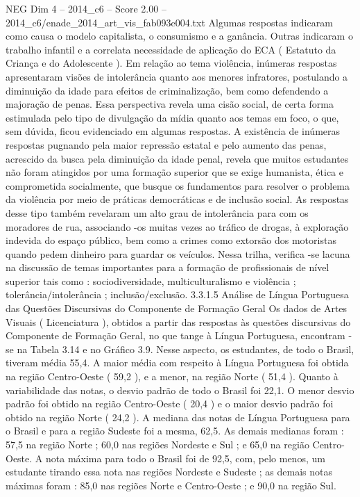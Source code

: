 \begin{textsample}{NEG Dim 4 – 2014\_c6 – Score 2.00 – 2014\_c6/enade\_2014\_art\_vis\_fab093e004.txt}
Algumas respostas indicaram como causa o modelo capitalista, o consumismo e a ganância.
Outras indicaram o trabalho infantil e a correlata necessidade de aplicação do ECA ( Estatuto da Criança e do Adolescente ).
Em relação ao tema violência, inúmeras respostas apresentaram visões de intolerância quanto aos menores infratores, postulando a diminuição da idade para efeitos de criminalização, bem como defendendo a majoração de penas.
Essa perspectiva revela uma cisão social, de certa forma estimulada pelo tipo de divulgação da mídia quanto aos temas em foco, o que, sem dúvida, ficou evidenciado em algumas respostas.
A existência de inúmeras respostas pugnando pela maior repressão estatal e pelo aumento das penas, acrescido da busca pela diminuição da idade penal, revela que muitos estudantes não foram atingidos por uma formação superior que se exige humanista, ética e comprometida socialmente, que busque os fundamentos para resolver o problema da violência por meio de práticas democráticas e de inclusão social.
As respostas desse tipo também revelaram um alto grau de intolerância para com os moradores de rua, associando -os muitas vezes ao tráfico de drogas, à exploração indevida do espaço público, bem como a crimes como extorsão dos motoristas quando pedem dinheiro para guardar os veículos.
Nessa trilha, verifica -se lacuna na discussão de temas importantes para a formação de profissionais de nível superior tais como : sociodiversidade, multiculturalismo e violência ; tolerância/intolerância ; inclusão/exclusão. 3.3.1.5 Análise de Língua Portuguesa das Questões Discursivas do Componente de Formação Geral Os dados de Artes Visuais ( Licenciatura ), obtidos a partir das respostas às questões discursivas do Componente de Formação Geral, no que tange à Língua Portuguesa, encontram -se na Tabela 3.14 e no Gráfico 3.9.
Nesse aspecto, os estudantes, de todo o Brasil, tiveram média 55,4.
A maior média com respeito à Língua Portuguesa foi obtida na região Centro-Oeste ( 59,2 ), e a menor, na região Norte ( 51,4 ).
Quanto à variabilidade das notas, o desvio padrão de todo o Brasil foi 22,1.
O menor desvio padrão foi obtido na região Centro-Oeste ( 20,4 ) e o maior desvio padrão foi obtido na região Norte ( 24,2 ).
A mediana das notas de Língua Portuguesa para o Brasil e para a região Sudeste foi a mesma, 62,5.
As demais medianas foram : 57,5 na região Norte ; 60,0 nas regiões Nordeste e Sul ; e 65,0 na região Centro-Oeste.
A nota máxima para todo o Brasil foi de 92,5, com, pelo menos, um estudante tirando essa nota nas regiões Nordeste e Sudeste ; as demais notas máximas foram : 85,0 nas regiões Norte e Centro-Oeste ; e 90,0 na região Sul.

\end{textsample}
